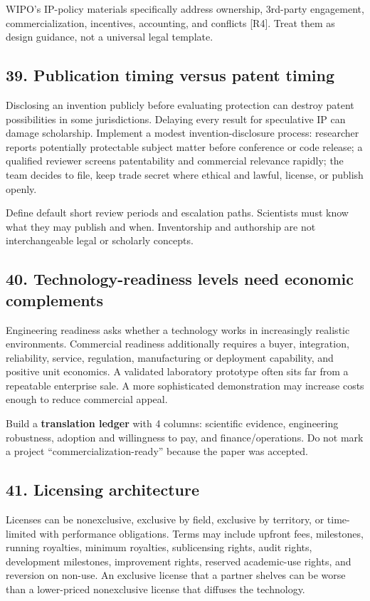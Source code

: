 WIPO's IP-policy materials specifically address ownership, 3rd-party engagement, commercialization, incentives, accounting, and conflicts [R4]. Treat them as design guidance, not a universal legal template.

\subsection{39. Publication timing versus patent timing}

Disclosing an invention publicly before evaluating protection can destroy patent possibilities in some jurisdictions. Delaying every result for speculative IP can damage scholarship. Implement a modest invention-disclosure process: researcher reports potentially protectable subject matter before conference or code release; a qualified reviewer screens patentability and commercial relevance rapidly; the team decides to file, keep trade secret where ethical and lawful, license, or publish openly.

Define default short review periods and escalation paths. Scientists must know what they may publish and when. Inventorship and authorship are not interchangeable legal or scholarly concepts.

\subsection{40. Technology-readiness levels need economic complements}

Engineering readiness asks whether a technology works in increasingly realistic environments. Commercial readiness additionally requires a buyer, integration, reliability, service, regulation, manufacturing or deployment capability, and positive unit economics. A validated laboratory prototype often sits far from a repeatable enterprise sale. A more sophisticated demonstration may increase costs enough to reduce commercial appeal.

Build a \textbf{translation ledger} with 4 columns: scientific evidence, engineering robustness, adoption and willingness to pay, and finance/operations. Do not mark a project ``commercialization-ready'' because the paper was accepted.

\subsection{41. Licensing architecture}

Licenses can be nonexclusive, exclusive by field, exclusive by territory, or time-limited with performance obligations. Terms may include upfront fees, milestones, running royalties, minimum royalties, sublicensing rights, audit rights, development milestones, improvement rights, reserved academic-use rights, and reversion on non-use. An exclusive license that a partner shelves can be worse than a lower-priced nonexclusive license that diffuses the technology.

